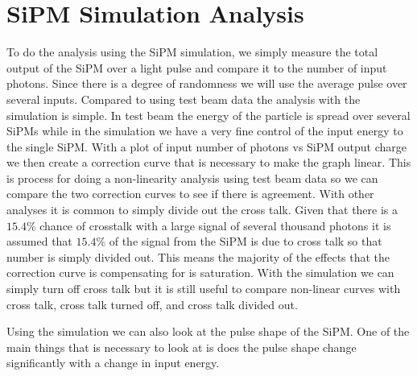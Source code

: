 \section{SiPM Simulation Analysis}

To do the analysis using the SiPM simulation, we simply measure the total output of the SiPM over a light pulse and compare it to the number of input photons. Since there is a degree of randomness we will use the average pulse over several inputs. Compared to using test beam data the analysis with the simulation is simple. In test beam the energy of the particle is spread over several SiPMs while in the simulation we have a very fine control of the input energy to the single SiPM. With a plot of input number of photons vs SiPM output charge we then create a correction curve that is necessary to make the graph linear. This is process for doing a non-linearity analysis using test beam data so we can compare the two correction curves to see if there is agreement. With other analyses it is common to simply divide out the cross talk. Given that there is a $15.4\%$ chance of crosstalk with a large signal of several thousand photons it is assumed that $15.4\%$ of the signal from the SiPM is due to cross talk so that number is simply divided out. This means the majority of the effects that the correction curve is compensating for is saturation. With the simulation we can simply turn off cross talk but it is still useful to compare non-linear curves with cross talk, cross talk turned off, and cross talk divided out.



Using the simulation we can also look at the pulse shape of the SiPM. One of the main things that is necessary to look at is does the pulse shape change significantly with a change in input energy.

